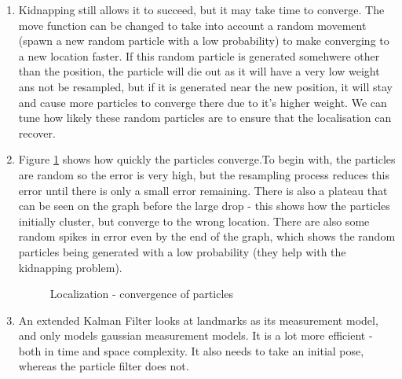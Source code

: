 \documentclass[12pt,a4paper]{article}
\begin{document}
\begin{enumerate}[label=(\alph*)]
	\item Kidnapping still allows it to succeed, but it may take time to converge. The move function can be changed to take into account a random movement (spawn a new random particle with a low probability) to make converging to a new location faster. If this random particle is generated somehwere other than the position, the particle will die out as it will have a very low weight ans not be resampled, but if it is generated near the new position, it will stay and cause more particles to converge there due to it's higher weight. We can tune how likely these random particles are to ensure that the localisation can recover.
	\item Figure \ref{fig:localization} shows how quickly the particles converge.To begin with, the particles are random so the error is very high, but the resampling process reduces this error until there is only a small error remaining. There is also a plateau that can be seen on the graph before the large drop - this shows how the particles initially cluster, but converge to the wrong location. There are also some random spikes in error even by the end of the graph, which shows the random particles being generated with a low probability (they help with the kidnapping problem).
	\begin{figure}[h]
		\centering
		\qquad
		\caption{Localization - convergence of particles}%
		\label{fig:localization}%
	\end{figure}

	\item An extended Kalman Filter looks at landmarks as its measurement model, and only models gaussian measurement models. It is a lot more efficient - both in time and space complexity. It also needs to take an initial pose, whereas the particle filter does not.
\end{enumerate}
\end{document}
